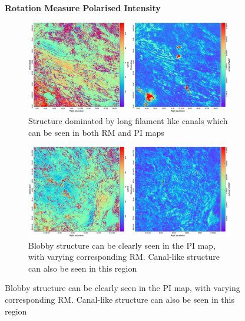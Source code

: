 \begin{figure}
    \centering
    {\large\textbf{Rotation Measure \hspace{10em} Polarised Intensity}\par\vspace{0.5em}}
     \begin{subfigure}[b]{\textwidth}
        \includegraphics[width=\linewidth]{Thesis_Template/Figures/RM_PI top right.png}
        \caption{Structure dominated by long filament like canals which can be seen in both RM and PI maps}
        \label{fig: canals zoom}
    \end{subfigure}

    
    \vspace*{0.05cm}

    
    \begin{subfigure}[b]{\textwidth}
        \includegraphics[width=\linewidth]{Thesis_Template/Figures/RM_PI bottom right.png}
        \caption{Blobby structure can be clearly seen in the PI map, with varying corresponding RM. Canal-like structure can also be seen in this region}
        \label{fig: blobby zoom}
    \end{subfigure}

    
    \vspace*{0.05cm}


\end{figure}
